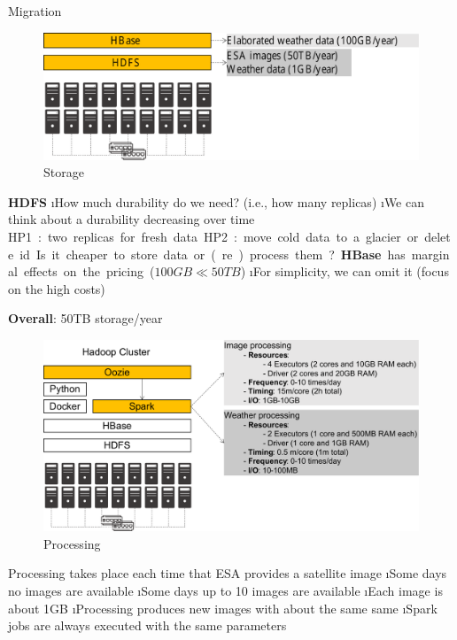 \begin{frame}{Migration}
\framebreak

\begin{figure}
    \centering
    \includegraphics[scale=.5]{imgs/migration1.pdf}
    \caption{Storage}
\end{figure}

\framebreak

\textbf{HDFS}
\i How much durability do we need? (i.e., how many replicas)
\i We can think about a durability decreasing over time
\si HP1: two replicas for fresh data
\si HP2: move cold data to a glacier or delete id
\si Is it cheaper to store data or (re)process them?

\textbf{HBase} has marginal effects on the pricing ($100GB \ll 50TB$)
\i For simplicity, we can omit it (focus on the high costs)

\textbf{Overall}: 50TB storage/year

\framebreak

\begin{figure}
    \centering
    \includegraphics[scale=.5]{imgs/migration2.pdf}
    \caption{Processing}
\end{figure}

\framebreak

Processing takes place each time that ESA provides a satellite image
\i Some days no images are available
\i Some days up to 10 images are available
\i Each image is about 1GB
\i Processing produces new images with about the same same
\i Spark jobs are always executed with the same parameters 


\end{frame}
